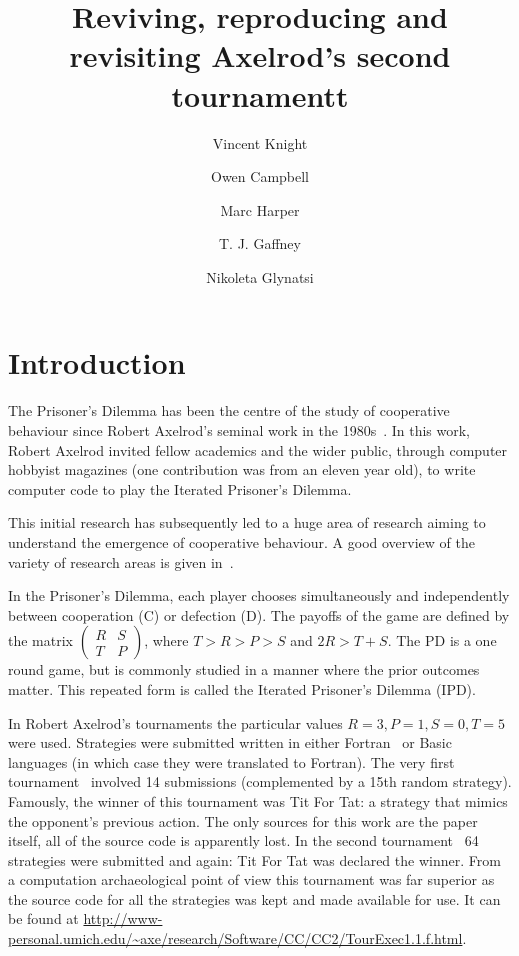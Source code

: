 \documentclass{article}
\title{Reviving, reproducing and revisiting Axelrod's second tournamentt}
\author{Vincent Knight \and Owen Campbell \and Marc Harper \and T. J. Gaffney \and Nikoleta Glynatsi}
\begin{document}
\maketitle

\section{Introduction}\label{sec:introduction}

The Prisoner's Dilemma has been the centre of the study of cooperative behaviour
since Robert Axelrod's seminal work in the 1980s~\cite{Axelrod1980a,
Axelrod1980b, Axelrodbook}. In this work, Robert Axelrod invited fellow
academics and the wider public, through computer hobbyist magazines (one
contribution was from an eleven year old), to write computer code to play the
Iterated Prisoner's Dilemma.

This initial research has subsequently led to a huge area
of research aiming to understand the emergence of cooperative behaviour. A good
overview of the variety of research areas is given in~\cite{Nowak2006}.

In the Prisoner's Dilemma, each player chooses
simultaneously and independently
between cooperation (C) or defection (D). The payoffs of
the game are defined by the matrix
\(
\begin{pmatrix}
    R & S \\ 
    T & P
\end{pmatrix}
\),
where $T > R > P > S$ and $2R > T + S$. The PD is a one
round game, but is commonly studied in a manner where the prior outcomes
matter. This repeated form is called the Iterated Prisoner's
Dilemma (IPD).


In Robert Axelrod's tournaments the particular values \(R=3, P=1, S=0, T=5\)
were used.  Strategies were submitted written in either
Fortran~\cite{smith1994programming} or Basic~\cite{Bishop2004}
languages (in which case they were translated to Fortran). The very first
tournament~\cite{Axelrod1980a} involved 14 submissions  (complemented by a
15th random strategy). Famously, the winner of this tournament was Tit For
Tat: a strategy that mimics the opponent's previous action. The only sources
for this work are the paper itself, all of the source code is apparently lost.
In the second tournament~\cite{Axelrod1980b} 64 strategies were submitted and
again: Tit For Tat was declared the winner. From a computation archaeological
point of view this tournament was far superior as the source code for all the
strategies was kept and made available for use. It can be found at
\url{http://www-personal.umich.edu/~axe/research/Software/CC/CC2/TourExec1.1.f.html}.
\end{document}
